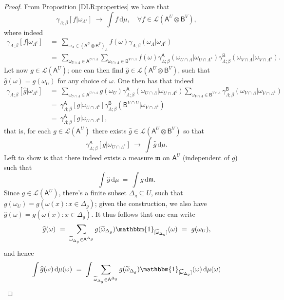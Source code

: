 \documentclass[12pt]{article}
\renewcommand{\AA}{\mathsf{A}}
\newcommand{\AB}{\mathsf{B}}
\renewcommand{\d}{\mathrm{d}}
\newcommand{\Loc}{\mathcal{L}}
\newcommand{\ra}{\rightarrow}
\newcommand{\1}{\mathbbm{1}}
\renewcommand{\c}{\mathsf{c}}
\newcommand{\5}{\vspace{0.5cm}}
\renewcommand{\tilde}{\widetilde}
\renewcommand{\hat}{\widehat}
\theoremstyle{definition}
\begin{document}
\begin{proof}
From Proposition \ref{DLR:properties} we have that
$$\gamma_{\Lambda;\beta}[f|\omega_{\Lambda^\c}] ~\ra~ \int f\,\d\mu, \quad \forall f\in\Loc(\AA^U\otimes\AB^V),$$
where indeed
\begin{align*}
\gamma_{\Lambda;\beta}[f|\omega_{\Lambda^\c}] ~&=~ \sum_{\omega_\Lambda\in(\AA^U\otimes\AB^V)_\Lambda} f(\omega)\gamma_{\Lambda;\beta}(\omega_\Lambda|\omega_{\Lambda^\c}) \\
&=~ \sum_{\omega_{U\cap\Lambda}\in\AA^{U\cap\Lambda}}\sum_{\omega_{V\cap\Lambda}\in\AB^{V\cap\Lambda}}f(\omega)\gamma_{\Lambda;\beta}^\AA(\omega_{U\cap\Lambda}|\omega_{U\cap\Lambda^\c})\gamma_{\Lambda;\beta}^\AB(\omega_{V\cap\Lambda}|\omega_{V\cap\Lambda^\c}).
\end{align*}
Let now $g\in\Loc(\AA^U)$; one can then find $\hat{g}\in\Loc(\AA^U\otimes\AB^V)$, such that $\hat{g}(\omega)=g(\omega_U)$ for any choice of $\omega$. One then has that indeed
\begin{align*}
\gamma_{\Lambda;\beta}[\hat{g}|\omega_{\Lambda^\c}] ~&=~ \sum_{\omega_{U\cap\Lambda}\in\AA^{U\cap\Lambda}}g(\omega_U)\gamma_{\Lambda;\beta}^\AA(\omega_{U\cap\Lambda}|\omega_{U\cap\Lambda^\c})\sum_{\omega_{V\cap\Lambda}\in\AB^{V\cap\Lambda}}\gamma_{\Lambda;\beta}^{\AB}(\omega_{V\cap \Lambda}|\omega_{V\cap\Lambda^\c}) \\
&=~ \gamma_{\Lambda;\beta}^\AA[g|\omega_{U\cap\Lambda^\c}]\gamma_{\Lambda;\beta}^\AB(\AB^{V\cap U}|\omega_{V\cap\Lambda^\c}) \\
&=~ \gamma_{\Lambda;\beta}^\AA[g|\omega_{U\cap\Lambda^\c}],
\end{align*} 
that is, for each $g\in\Loc(\AA^U)$ there exists $\hat{g}\in\Loc(\AA^U\otimes\AB^V)$ so that 
$$\gamma_{\Lambda;\beta}^\AA[g|\omega_{U\cap\Lambda^\c}] ~\ra~ \int \hat{g}\,\d\mu.$$
Left to show is that there indeed exists a measure $\mathfrak{m}$ on $\AA^U$ (independent of $g$) such that 
$$\int \hat{g}\,\d\mu ~=~ \int g\,\d\mathfrak{m}.$$
Since $g\in\Loc(\AA^U)$, there's a finite subset $\Delta_g\subseteq U$, such that $g(\omega_U)=g(\omega(x):x\in\Delta_g)$; given the construction, we also have $\hat{g}(\omega)=g(\omega(x):x\in\Delta_g)$. It thus follows that one can write
$$\hat{g}(\omega) ~=~  \sum_{\tilde{\omega}_{\Delta_g}\in\AA^{\Delta_g}}g(\tilde{\omega}_{\Delta_g})\1_{[\tilde{\omega}_{\Delta_g}]}(\omega) ~=~ g(\omega_U),$$
and hence
\begin{align*}
\int \hat{g}(\omega)\,\d\mu(\omega) ~&=~ \int \sum_{\tilde{\omega}_{\Delta_g}\in\AA^{\Delta_g}}g(\tilde{\omega}_{\Delta_g})\1_{[\tilde{\omega}_{\Delta_g}]}(\omega)\,\d\mu(\omega) \\

\end{align*}
\end{proof}
\end{document}
